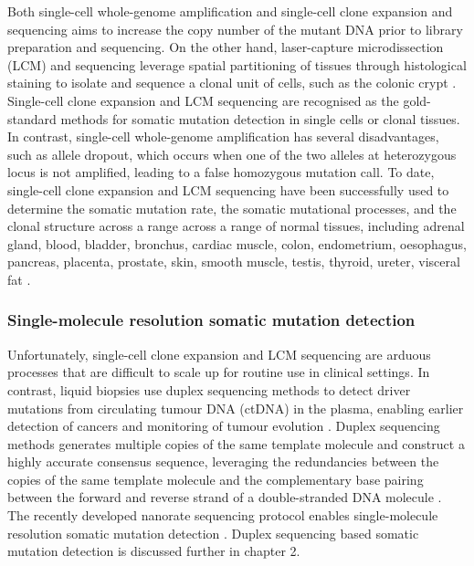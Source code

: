 Both single-cell whole-genome amplification \cite{Lodato2018-hh} and single-cell clone expansion and sequencing \cite{Lee-Six2018-qe, MSpencer_Chapman2021-cq} aims to increase the copy number of the mutant DNA prior to library preparation and sequencing. On the other hand, laser-capture microdissection (LCM) and sequencing leverage spatial partitioning of tissues through histological staining to isolate and sequence a clonal unit of cells, such as the colonic crypt \cite{Ellis2021-it}. Single-cell clone expansion and LCM sequencing are recognised as the gold-standard methods for somatic mutation detection in single cells or clonal tissues. In contrast, single-cell whole-genome amplification has several disadvantages, such as allele dropout, which occurs when one of the two alleles at heterozygous locus is not amplified, leading to a false homozygous mutation call. To date, single-cell clone expansion and LCM sequencing have been successfully used to determine the somatic mutation rate, the somatic mutational processes, and the clonal structure across a range across a range of normal tissues, including adrenal gland, blood, bladder, bronchus, cardiac muscle, colon, endometrium, oesophagus, pancreas, placenta, prostate, skin, smooth muscle, testis, thyroid, ureter, visceral fat \cite{Lee-Six2018-qe, MSpencer_Chapman2021-cq, Martincorena2015-gu, Ju2017-vw, Martincorena2018-av, Brunner2019-xg, Lee-Six2019-vt, Yoshida2020-yr, Olafsson2020-vi, Moore2020-pi, Lawson2020-em, Coorens2021-ct, Robinson2021-te, Grossmann2021-gd, Moore2021-dl, Park2021-fx, Ng2021-jd, Mitchell2022-ry}. 

\subsubsection{Single-molecule resolution somatic mutation detection}

Unfortunately, single-cell clone expansion and LCM sequencing are arduous processes that are difficult to scale up for routine use in clinical settings. In contrast, liquid biopsies use duplex sequencing methods to detect driver mutations from circulating tumour DNA (ctDNA) in the plasma, enabling earlier detection of cancers and monitoring of tumour evolution \cite{Newman2016-cy}. Duplex sequencing methods generates multiple copies of the same template molecule and construct a highly accurate consensus sequence, leveraging the redundancies between the copies of the same template molecule and the complementary base pairing between the forward and reverse strand of a double-stranded DNA molecule \cite{Schmitt2012-yr, Hoang2016-jx, Abascal2021-pk}. The recently developed nanorate sequencing protocol enables single-molecule resolution somatic mutation detection \cite{Abascal2021-pk}. Duplex sequencing based somatic mutation detection is discussed further in chapter 2. 

